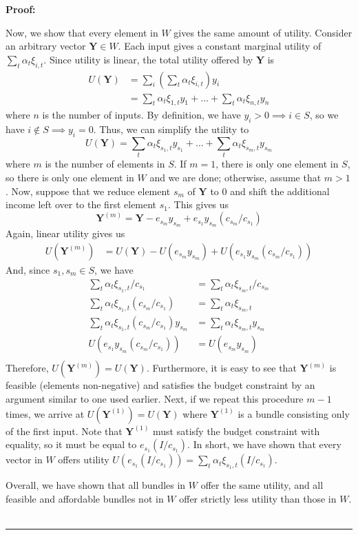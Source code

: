 \documentclass[11pt,a4paper,leqno]{extarticle}
\newenvironment{proof}[1][Proof]{\noindent\textbf{#1:} }{\ \rule{0.5em}{0.5em}}
\begin{document}
\begin{proof}
		
		Now, we show that every element in $W$ gives the same amount of utility. 
		Consider an arbitrary vector $\mathbf{Y} \in W$. Each input gives a constant marginal utility of $\sum_t \alpha_t \xi_{i,t}$. Since utility is linear, the total utility offered by $\mathbf{Y}$ is
		\begin{align*}
		U(\mathbf{Y}) &=  \sum_i \left(  \sum_t \alpha_t \xi_{i,t} \right) y_i \\
		&= \sum_t \alpha_t \xi_{1,t} y_1 + \dots + \sum_t \alpha_t \xi_{n,t} y_n
		\end{align*}
		where $n$ is the number of inputs. By definition, we have $y_i > 0 \implies i \in S$, so we have $i \not\in S \implies y_i = 0$. Thus, we can simplify the utility to 
		$$U(\mathbf{Y}) = \sum_t \alpha_t \xi_{s_1,t} y_{s_1} + \dots  + \sum_t \alpha_t \xi_{s_m,t} y_{s_m} $$
		where $m$ is the number of elements in $S$. If $m = 1$, there is only one element in $S$, so there is only one element in $W$ and we are done; otherwise, assume that $m > 1$. Now, suppose that we reduce element $s_m$ of $\mathbf{Y}$ to 0 and shift the additional income left over to the first element $s_1$. This gives us 
		$$\mathbf{Y}^{(m)} =  \mathbf{Y} - e_{s_m} y_{s_m} + e_{s_1} y_{s_m} (c_{s_m}/c_{s_1})$$
		Again, linear utility gives us 
		\begin{align*}
		U(\mathbf{Y}^{(m)}) &= U(\mathbf{Y}) - U(e_{s_m} y_{s_m}) + U(e_{s_1} y_{s_m} (c_{s_m}/c_{s_1})) 
		\end{align*}
		And, since $s_1, s_m \in S$, we have
		\begin{align*}
			\sum_t \alpha_t \xi_{s_1, t} /c_{s_1} &=	\sum_t \alpha_t \xi_{s_m, t} /c_{s_m}  \\
			\sum_t \alpha_t \xi_{s_1, t} (c_{s_m}/c_{s_1}) &=	\sum_t \alpha_t \xi_{s_m, t}  \\
			\sum_t \alpha_t \xi_{s_1, t} (c_{s_m}/c_{s_1}) y_{s_m} &=	\sum_t \alpha_t \xi_{s_m, t} y_{s_m} \\
			U(e_{s_1} y_{s_m} (c_{s_m}/c_{s_1})) &=	U(e_{s_m} y_{s_m})\\
		\end{align*}
		Therefore, $U(\mathbf{Y}^{(m)}) = U(\mathbf{Y})$. Furthermore, it is easy to see that $\mathbf{Y}^{(m)}$ is feasible (elements non-negative) and satisfies the budget constraint by an argument similar to one used earlier. Next, if we repeat this procedure $m-1$ times, we arrive at $U(\mathbf{Y}^{(1)}) = U(\mathbf{Y})$ where $\mathbf{Y}^{(1)}$ is a bundle consisting only of the first input. Note that $\mathbf{Y}^{(1)}$ must satisfy the budget constraint with equality, so it must be equal to $e_{s_1} (I/c_{s_1})$. In short, we have shown that every vector in $W$ offers utility $U( e_{s_1} (I/c_{s_1})) = \sum_t \alpha_t \xi_{{s_1},t} (I/c_{s_1})$. 
		
		Overall, we have shown that all bundles in $W$ offer the same utility, and all feasible and affordable bundles not in $W$ offer strictly less utility than those in $W$. \\
		\hfill
	\end{proof}
\end{document}
